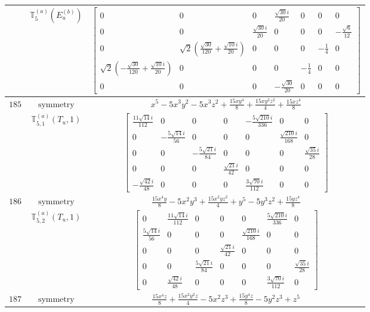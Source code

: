 \documentclass[fleqn,8pt,landscape]{jsarticle}
\begin{document}
\begin{longtable}{ccc}
$  $ & $ \mathbb{T}_{5}^{(a)}(E_{u}^{(b)}) $ & $ \begin{bmatrix} 0 & 0 & 0 & \frac{\sqrt{30} i}{20} & 0 & 0 & 0 \\ 0 & 0 & \frac{\sqrt{30} i}{20} & 0 & 0 & 0 & - \frac{\sqrt{6}}{12} \\ 0 & \sqrt{2} \left(\frac{\sqrt{30}}{120} + \frac{\sqrt{10} i}{20}\right) & 0 & 0 & 0 & - \frac{1}{4} & 0 \\ \sqrt{2} \left(- \frac{\sqrt{30}}{120} + \frac{\sqrt{10} i}{20}\right) & 0 & 0 & 0 & - \frac{1}{4} & 0 & 0 \\ 0 & 0 & 0 & - \frac{\sqrt{30}}{20} & 0 & 0 & 0 \end{bmatrix} $ \\ \hline
$ 185 $ & $ \text{symmetry} $ & $ x^{5} - 5 x^{3} y^{2} - 5 x^{3} z^{2} + \frac{15 x y^{4}}{8} + \frac{15 x y^{2} z^{2}}{4} + \frac{15 x z^{4}}{8} $ \\
$  $ & $ \mathbb{T}_{5,1}^{(a)}(T_{u},1) $ & $ \begin{bmatrix} \frac{11 \sqrt{14} i}{112} & 0 & 0 & 0 & - \frac{5 \sqrt{210} i}{336} & 0 & 0 \\ 0 & - \frac{5 \sqrt{14} i}{56} & 0 & 0 & 0 & \frac{\sqrt{210} i}{168} & 0 \\ 0 & 0 & - \frac{5 \sqrt{21} i}{84} & 0 & 0 & 0 & \frac{\sqrt{35} i}{28} \\ 0 & 0 & 0 & \frac{\sqrt{21} i}{42} & 0 & 0 & 0 \\ - \frac{\sqrt{42} i}{48} & 0 & 0 & 0 & \frac{3 \sqrt{70} i}{112} & 0 & 0 \end{bmatrix} $ \\ \hline
$ 186 $ & $ \text{symmetry} $ & $ \frac{15 x^{4} y}{8} - 5 x^{2} y^{3} + \frac{15 x^{2} y z^{2}}{4} + y^{5} - 5 y^{3} z^{2} + \frac{15 y z^{4}}{8} $ \\
$  $ & $ \mathbb{T}_{5,2}^{(a)}(T_{u},1) $ & $ \begin{bmatrix} 0 & \frac{11 \sqrt{14} i}{112} & 0 & 0 & 0 & \frac{5 \sqrt{210} i}{336} & 0 \\ \frac{5 \sqrt{14} i}{56} & 0 & 0 & 0 & \frac{\sqrt{210} i}{168} & 0 & 0 \\ 0 & 0 & 0 & \frac{\sqrt{21} i}{42} & 0 & 0 & 0 \\ 0 & 0 & \frac{5 \sqrt{21} i}{84} & 0 & 0 & 0 & \frac{\sqrt{35} i}{28} \\ 0 & \frac{\sqrt{42} i}{48} & 0 & 0 & 0 & \frac{3 \sqrt{70} i}{112} & 0 \end{bmatrix} $ \\ \hline
$ 187 $ & $ \text{symmetry} $ & $ \frac{15 x^{4} z}{8} + \frac{15 x^{2} y^{2} z}{4} - 5 x^{2} z^{3} + \frac{15 y^{4} z}{8} - 5 y^{2} z^{3} + z^{5} $ \\

\end{longtable}
\end{document}
